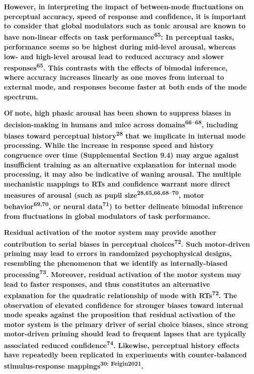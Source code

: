 \documentclass[
]{article}
\begin{document}
\textbf{However, in interpreting the impact of between-mode fluctuations
on perceptual accuracy, speed of response and confidence, it is
important to consider that global modulators such as tonic arousal are
known to have non-linear effects on task
performance\textsuperscript{65}: In perceptual tasks, performance seems
so be highest during mid-level arousal, whereas low- and high-level
arousal lead to reduced accuracy and slower
responses\textsuperscript{65}. This contrasts with the effects of
bimodal inference, where accuracy increases linearly as one moves from
internal to external mode, and responses become faster at both ends of
the mode spectrum.}

\textbf{Of note, high phasic arousal has been shown to suppress biases
in decision-making in humans and mice across
domains\textsuperscript{66--68}, including biases toward perceptual
history\textsuperscript{28} that we implicate in internal mode
processing. While the increase in response speed and history congruence
over time (Supplemental Section 9.4) may argue against insufficient
training as an alternative explanation for internal mode processing, it
may also be indicative of waning arousal. The multiple mechanistic
mappings to RTs and confidence warrant more direct measures of arousal
(such as pupil size\textsuperscript{28,65,66,68--70}, motor
behavior\textsuperscript{69,70}, or neural data\textsuperscript{71}) to
better delineate bimodal inference from fluctuations in global
modulators of task performance.}

\textbf{Residual activation of the motor system may provide another
contribution to serial biases in perceptual choices\textsuperscript{72}.
Such motor-driven priming may lead to errors in randomized
psychophysical designs, resembling the phenomenon that we identify as
internally-biased processing\textsuperscript{73}. Moreover, residual
activation of the motor system may lead to faster responses, and thus
constitutes an alternative explanation for the quadratic relationship of
mode with RTs\textsuperscript{72}. The observation of elevated
confidence for stronger biases toward internal mode speaks against the
proposition that residual activation of the motor system is the primary
driver of serial choice biases, since strong motor-driven priming should
lead to frequent lapses that are typically associated reduced
confidence\textsuperscript{74}. Likewise, perceptual history effects
have repeatedly been replicated in experiments with counter-balanced
stimulus-response mappings\textsuperscript{30: Feigin2021}.}
\end{document}
